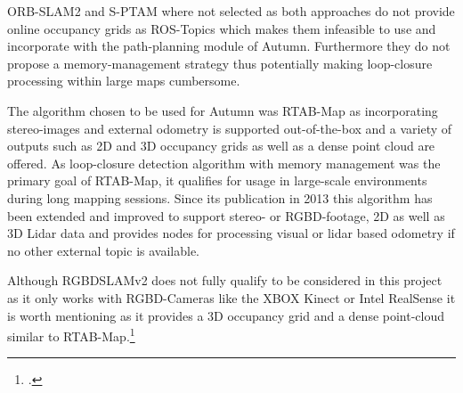 ORB-SLAM2 and S-PTAM where not selected as both approaches do not provide online occupancy grids as ROS-Topics which makes them infeasible to use and incorporate with the path-planning module of Autumn. Furthermore they do not propose a memory-management strategy thus potentially making loop-closure processing within large maps cumbersome. 

The algorithm chosen to be used for Autumn was RTAB-Map as incorporating stereo-images and external odometry is supported out-of-the-box and a variety of outputs such as 2D and 3D occupancy grids as well as a dense point cloud are offered. 
As loop-closure detection algorithm with memory management was the primary goal of RTAB-Map, it qualifies for usage in large-scale environments during long mapping sessions.
Since its publication in 2013 this algorithm has been extended and improved to support stereo- or RGBD-footage, 2D as well as 3D Lidar data and provides nodes for processing visual or lidar based odometry if no other external topic is available. 

Although RGBDSLAMv2 does not fully qualify to be considered in this project as it only works with RGBD-Cameras like the XBOX Kinect or Intel RealSense it is worth mentioning as it provides a 3D occupancy grid and a dense point-cloud similar to RTAB-Map.\footcite{labbe2019rtab}

